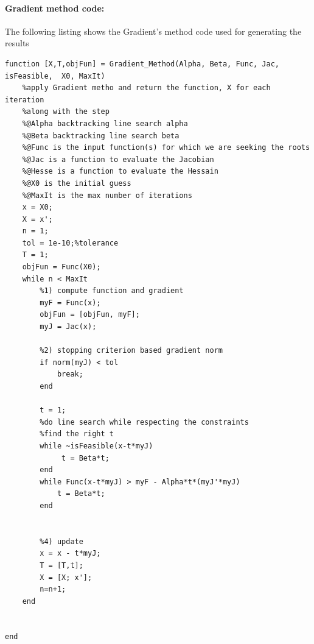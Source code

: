 \documentclass[12pt] {article}
\begin{document}
\newpage
\paragraph{Gradient method code:}
The following listing shows the Gradient's method code used for generating the results 
\begin{lstlisting}
function [X,T,objFun] = Gradient_Method(Alpha, Beta, Func, Jac, isFeasible,  X0, MaxIt)   
    %apply Gradient metho and return the function, X for each iteration 
    %along with the step 
    %@Alpha backtracking line search alpha 
    %@Beta backtracking line search beta
    %@Func is the input function(s) for which we are seeking the roots    
    %@Jac is a function to evaluate the Jacobian
    %@Hesse is a function to evaluate the Hessain
    %@X0 is the initial guess     
    %@MaxIt is the max number of iterations     
    x = X0;    
    X = x';
    n = 1;
    tol = 1e-10;%tolerance
    T = 1;
    objFun = Func(X0);
    while n < MaxIt
        %1) compute function and gradient    
        myF = Func(x);
        objFun = [objFun, myF];
        myJ = Jac(x);
        
        %2) stopping criterion based gradient norm 
        if norm(myJ) < tol
            break;
        end
                
        t = 1;
        %do line search while respecting the constraints 
        %find the right t 
        while ~isFeasible(x-t*myJ)
             t = Beta*t;
        end        
        while Func(x-t*myJ) > myF - Alpha*t*(myJ'*myJ)
            t = Beta*t;
        end 
        
        
        %4) update 
        x = x - t*myJ;
        T = [T,t];
        X = [X; x'];
        n=n+1;
    end
    
    
end
\end{lstlisting}
\end{document}
